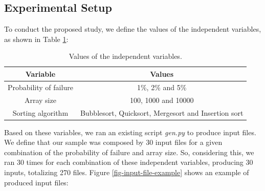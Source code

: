 

\subsection{Experimental Setup}

To conduct the proposed study, we define the values of the independent variables, as shown in Table \ref{table-independent-variables-values}:

\begin{table}[H]
    \caption{Values of the independent variables.}
    \begin{center}
    \begin{tabular}{|c|c|}
    \hline
    \textbf{Variable} & \textbf{Values} \\
    \hline
    Probability of failure & 1\%, 2\% and 5\% \\
    \hline
    Array size & 100, 1000 and 10000 \\
    \hline
    Sorting algorithm & Bubblesort, Quicksort, Mergesort and Insertion sort \\
    \hline
    \end{tabular}
    \label{table-independent-variables-values}
    \end{center}
\end{table}

Based on these variables, we ran an existing script \textit{gen.py} to produce input files. We define that our sample was composed by 30 input files for a given combination of the probability of failure and array size. So, considering this, we ran 30 times for each combination of these independent variables, producing 30 inputs, totalizing 270 files. Figure \ref{fig-input-file-example} shows an example of produced input files:

